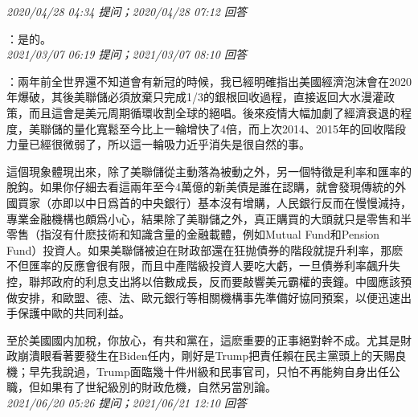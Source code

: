 \documentclass[twocolumn]{ctexart}
\begin{document}
\textit{\hfill\noindent\small 2020/04/28 04:34 提问；2020/04/28 07:12 回答}

：是的。
\\

\textit{\hfill\noindent\small 2021/03/07 06:19 提问；2021/03/07 08:10 回答}

：兩年前全世界還不知道會有新冠的時候，我已經明確指出美國經濟泡沫會在2020年爆破，其後美聯儲必須放棄只完成1/3的銀根回收過程，直接返回大水漫灌政策，而且這會是美元周期循環收割全球的絕唱。後來疫情大幅加劇了經濟衰退的程度，美聯儲的量化寬鬆至今比上一輪增快了4倍，而上次2014、2015年的回收階段力量已經很微弱了，所以這一輪吸力近乎消失是很自然的事。

這個現象體現出來，除了美聯儲從主動落為被動之外，另一個特徵是利率和匯率的脫鈎。如果你仔細去看這兩年至今4萬億的新美債是誰在認購，就會發現傳統的外國買家（亦即以中日爲首的中央銀行）基本沒有增購，人民銀行反而在慢慢減持，專業金融機構也頗爲小心，結果除了美聯儲之外，真正購買的大頭就只是零售和半零售（指沒有什麽技術和知識含量的金融載體，例如Mutual Fund和Pension Fund）投資人。如果美聯儲被迫在財政部還在狂抛債券的階段就提升利率，那麽不但匯率的反應會很有限，而且中產階級投資人要吃大虧，一旦債券利率飆升失控，聯邦政府的利息支出將以倍數成長，反而要敲響美元霸權的喪鐘。中國應該預做安排，和歐盟、德、法、歐元銀行等相關機構事先準備好協同預案，以便迅速出手保護中歐的共同利益。

至於美國國内加稅，你放心，有共和黨在，這麽重要的正事絕對幹不成。尤其是財政崩潰眼看著要發生在Biden任内，剛好是Trump把責任賴在民主黨頭上的天賜良機；早先我說過，Trump面臨幾十件州級和民事官司，只怕不再能夠自身出任公職，但如果有了世紀級別的財政危機，自然另當別論。
\\

\textit{\hfill\noindent\small 2021/06/20 05:26 提问；2021/06/21 12:10 回答}
\end{document}
